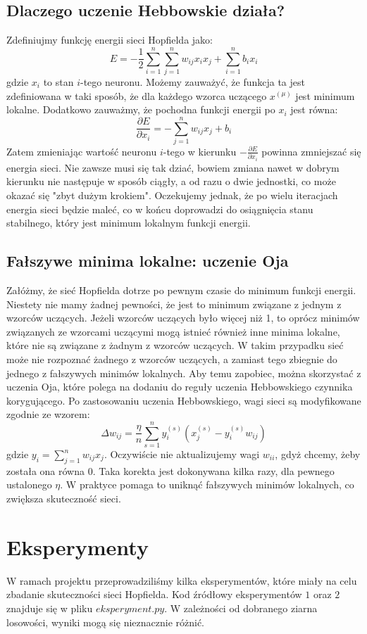 \documentclass{article}
\begin{document}
\subsection{Dlaczego uczenie Hebbowskie działa?}
Zdefiniujmy funkcję energii sieci Hopfielda jako:
$$E = -\frac{1}{2} \sum_{i=1}^{n} \sum_{j=1}^{n} w_{ij} x_i x_j + \sum_{i=1}^{n} b_i x_i$$
gdzie $x_i$ to stan $i$-tego neuronu.
Możemy zauważyć, że funkcja ta jest zdefiniowana w taki sposób, że dla każdego wzorca uczącego $x^{(\mu)}$ jest minimum lokalne.
Dodatkowo zauważmy, że pochodna funkcji energii po $x_i$ jest równa:
$$\frac{\partial E}{\partial x_i} = -\sum_{j=1}^{n} w_{ij} x_j + b_i$$
Zatem zmieniając wartość neuronu $i$-tego w kierunku $-\frac{\partial E}{\partial x_i}$ powinna zmniejszać się energia sieci.
Nie zawsze musi się tak dziać, bowiem zmiana nawet w dobrym kierunku nie następuje w sposób ciągły, a od razu o dwie jednostki,
co może okazać się "zbyt dużym krokiem". Oczekujemy jednak, że po wielu iteracjach energia sieci będzie maleć,
co w końcu doprowadzi do osiągnięcia stanu stabilnego, który jest minimum lokalnym funkcji energii.

\subsection{Fałszywe minima lokalne: uczenie Oja}
Załóżmy, że sieć Hopfielda dotrze po pewnym czasie do minimum funkcji energii.
Niestety nie mamy żadnej pewności, że jest to minimum związane z jednym z wzorców uczących.
Jeżeli wzorców uczących było więcej niż 1, to oprócz minimów związanych ze wzorcami uczącymi 
mogą istnieć również inne minima lokalne, które nie są związane z żadnym z wzorców uczących.
W takim przypadku sieć może nie rozpoznać żadnego z wzorców uczących, a zamiast tego zbiegnie do jednego z fałszywych minimów lokalnych.
Aby temu zapobiec, można skorzystać z uczenia Oja, które polega na dodaniu do reguły uczenia Hebbowskiego czynnika korygującego.
Po zastosowaniu uczenia Hebbowskiego, wagi sieci są modyfikowane zgodnie ze wzorem:
$$\Delta w_{ij} = \frac{\eta}{n} \sum_{s=1}^{n}y_i^{(s)}(x_j^{(s)} - y_i^{(s)}w_{ij})$$
gdzie $y_i = \sum_{j = 1}^{n} w_{ij}x_j$. Oczywiście nie aktualizujemy wagi $w_{ii}$,
gdyż chcemy, żeby została ona równa $0$.
Taka korekta jest dokonywana kilka razy, dla pewnego ustalonego $\eta$.
W praktyce pomaga to uniknąć fałszywych minimów lokalnych, co zwiększa skuteczność sieci.

\section{Eksperymenty}
W ramach projektu przeprowadziliśmy kilka eksperymentów, które miały na celu zbadanie skuteczności sieci Hopfielda.
Kod źródłowy eksperymentów $1$ oraz $2$ znajduje się w pliku $eksperyment.py$.
W zależności od dobranego ziarna losowości, wyniki mogą się nieznacznie różnić.
\end{document}
